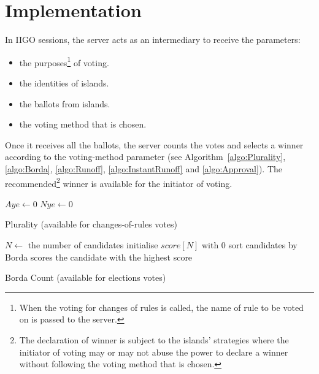 \section{Implementation}
\label{sec:VotingImplementation}
In IIGO sessions, the server acts as an intermediary to receive the parameters:
\begin{itemize}
    \item the purposes\footnote{When the voting for changes of rules is called, the name of rule to be voted on is passed to the server.} of voting.
    \item the identities of islands.
    \item the ballots from islands.
    \item the voting method that is chosen.
\end{itemize}

Once it receives all the ballots, the server counts the votes and selects a winner according to the voting-method parameter (see Algorithm~\ref{algo:Plurality}, \ref{algo:Borda}, \ref{algo:Runoff}, \ref{algo:InstantRunoff} and \ref{algo:Approval}). The recommended\footnote{The declaration of winner is subject to the islands' strategies where the initiator of voting may or may not abuse the power to declare a winner without following the voting method that is chosen.} winner is available for the initiator of voting.

\begin{algorithm}[!h]
$Aye \gets 0$\;
$Nye \gets 0$\;
\caption{Plurality (available for changes-of-rules votes)}\label{algo:Plurality}
\end{algorithm}


\begin{algorithm}[!h]
$N \gets$ the number of candidates\;
initialise $score[N]$ with $0$\;
sort candidates by Borda scores\;
\Return the candidate with the highest score
\caption{Borda Count (available for elections votes)}\label{algo:Borda}
\end{algorithm}


